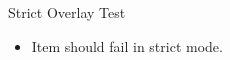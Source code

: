 \documentclass[14pt,t,overlay-policy=strict]{beamer-accessibility}
\begin{document}
\begin{frame}{Strict Overlay Test}
\begin{itemize}
\item<1-> Item should fail in strict mode.
\end{itemize}
\end{frame}
\end{document}
